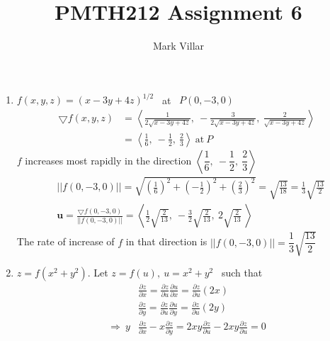 \documentclass[12pt]{amsart}
\title{PMTH212 Assignment 6}
\author{Mark Villar}
\begin{document}
 

\maketitle 

\begin{enumerate}
	
	\item $f(x,y,z)=(x-3y+4z)^{1/2}$ \ at \ $P(0,-3,0)$
		\begin{align*}
			\bigtriangledown f(x,y,z)&=\left<\frac{1}{2\sqrt{x-3y+4z}}, \ -\frac{3}{2\sqrt{x-3y+4z}}, \ \frac{2}{\sqrt{x-3y+4z}} \right> \\
			&=\left<\frac{1}{6}, \ -\frac{1}{2}, \ \frac{2}{3}\right> \ \text{at} \ P
		\end{align*}
		$f$ increases most rapidly in the direction $\left<\dfrac{1}{6}, \ -\dfrac{1}{2}, \ \dfrac{2}{3}\right>$
		\begin{align*}
			&||f(0,-3,0)||=\sqrt{\left(\frac{1}{6}\right)^2+\left(-\frac{1}{2}\right)^2+\left(\frac{2}{3}\right)^2}=\sqrt{\frac{13}{18}}=\frac{1}{3}\sqrt{\frac{13}{2}} \\
			&\mathbf{u}=\frac{\bigtriangledown f(0,-3,0)}{||f(0,-3,0)||}=\left<\frac{1}{2}\sqrt{\frac{2}{13}}, \ -\frac{3}{2}\sqrt{\frac{2}{13}}, \ 2\sqrt{\frac{2}{13}} \ \right>
		\end{align*}
		The rate of increase of $f$ in that direction is $||f(0,-3,0)||=\dfrac{1}{3}\sqrt{\dfrac{13}{2}}$
		
	\medskip
		
	\item $z=f(x^2+y^2)$. Let $z=f(u), \ u=x^2+y^2$ \ such that
		\begin{align*}
			&\frac{\partial z}{\partial x}=\frac{\partial z}{\partial u}\frac{\partial u}{\partial x}=\frac{\partial z}{\partial u}(2x) \\
			&\frac{\partial z}{\partial y}=\frac{\partial z}{\partial u}\frac{\partial u}{\partial y}=\frac{\partial z}{\partial u}(2y) \\
			\Rightarrow \ y&\frac{\partial z}{\partial x}-x\frac{\partial z}{\partial y}=2xy\frac{\partial z}{\partial u}-2xy\frac{\partial z}{\partial u}=0
		\end{align*}
		
		\medskip
							

\end{enumerate}
\end{document}
